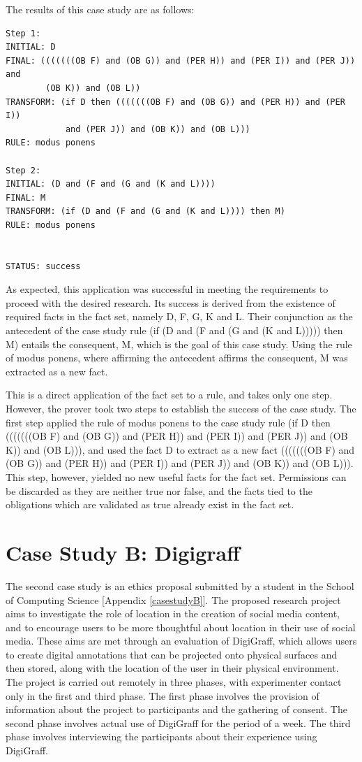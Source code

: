 \documentclass{l4proj}
\begin{document}
The results of this case study are as follows: 
\begin{verbatim}
Step 1: 
INITIAL: D
FINAL: (((((((OB F) and (OB G)) and (PER H)) and (PER I)) and (PER J)) and
        (OB K)) and (OB L))
TRANSFORM: (if D then (((((((OB F) and (OB G)) and (PER H)) and (PER I)) 
            and (PER J)) and (OB K)) and (OB L)))
RULE: modus ponens

Step 2: 
INITIAL: (D and (F and (G and (K and L))))
FINAL: M
TRANSFORM: (if (D and (F and (G and (K and L)))) then M)
RULE: modus ponens


STATUS: success
\end{verbatim}

As expected, this application was successful in meeting the requirements to proceed with the desired research. Its success is derived from the existence of required facts in the fact set, namely D, F, G, K and L. Their conjunction as the antecedent of the case study rule (if (D and (F and (G and (K and L))))) then M) entails the consequent, M, which is the goal of this case study. Using the rule of modus ponens, where affirming the antecedent affirms the consequent, M was extracted as a new fact. 

This is a direct application of the fact set to a rule, and takes only one step. However, the prover took two steps to establish the success of the case study. The first step applied the rule of modus ponens to the case study rule (if D then (((((((OB F) and (OB G)) and (PER H)) and (PER I)) and (PER J)) and (OB K)) and (OB L))), and used the fact D to extract as a new fact (((((((OB F) and (OB G)) and (PER H)) and (PER I)) and (PER J)) and (OB K)) and (OB L))). This step, however, yielded no new useful facts for the fact set. Permissions can be discarded as they are neither true nor false, and the facts tied to the obligations which are validated as true already exist in the fact set. 

\section{Case Study B: Digigraff}
The second case study is an ethics proposal submitted by a student in the School of Computing Science [Appendix \ref{casestudyB}]. The proposed research project aims to investigate the role of location in the creation of social media content, and to encourage users to be more thoughtful about location in their use of social media. These aims are met through an evaluation of DigiGraff, which allows users to create digital annotations that can be projected onto physical surfaces and then stored, along with the location of the user in their physical environment. The project is carried out remotely in three phases, with experimenter contact only in the first and third phase. The first phase involves the provision of information about the project to participants and the gathering of consent. The second phase involves actual use of DigiGraff for the period of a week. The third phase involves interviewing the participants about their experience using DigiGraff. 
\end{document}
